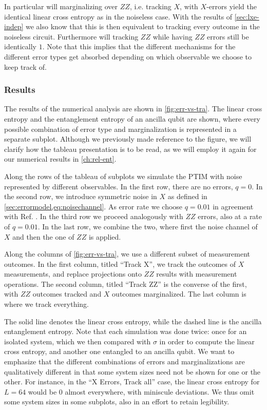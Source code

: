 In particular will marginalizing over $ZZ$, i.e. tracking $X$, with $X$-errors
yield the identical linear cross entropy as in the noiseless case. With the
results of \cref{sec:lxe-indep} we also know that this is then equivalent to
tracking every outcome in the noiseless circuit.
Furthermore will tracking
$ZZ$ while having $ZZ$ errors still be identically $1$. 
Note that this implies that the different mechanisms for the different error
types get absorbed depending on which observable we choose to keep track of. 

\subsubsection{Results}
The results of the numerical analysis are shown in \cref{fig:err-vs-tra}. The
linear cross entropy and the entanglement entropy of an ancilla qubit are shown,
where every possible combination of error type and marginalization is represented in
a separate subplot. Although we previously made reference to the figure, we
will clarify how the tableau presentation is to be read, as we will employ it
again for our numerical results in \cref{ch:rel-ent}.

Along the rows of the
tableau of subplots we simulate the PTIM with noise represented by different
observables. In the first row, there are no errors, $q=0$. In the second row,
we introduce symmetric noise in $X$ as defined in
\cref{sec:errormodel,eq:noisechannel}. As error rate we choose $q=0.01$ in
agreement with Ref. \cite{tikhanovskayaUniversalityCrossEntropy2023}. In the
third row we proceed analogously with $ZZ$ errors, also at a rate of $q=0.01$.
In the last row, we combine the two, where first the noise channel of $X$ and
then the one of $ZZ$ is applied. 

Along the columns of \cref{fig:err-vs-tra}, we use a different subset of
measurement outcomes. In the first column, titled \enquote{Track X}, we track
the outcomes of $X$ measurements, and replace projections onto $ZZ$ results
with measurement operations. The second column, titled \enquote{Track ZZ} is
the converse of the first, with $ZZ$ outcomes tracked and $X$ outcomes
marginalized. The last column is where we track everything. 

The solid line denotes the linear cross entropy, while the dashed line is the
ancilla entanglement entropy. Note that each simulation was done twice: once
for an isolated system, which we then compared with $\sigma$ in order to
compute the linear cross entropy, and another one entangled to an ancilla
qubit.  We want to emphasize that the different combinations of errors and
marginalizations are qualitatively different in that some system sizes need not
be shown for one or the other. For instance, in the \enquote{X Errors, Track
all} case, the linear cross entropy for $L=64$ would be $0$ almost everywhere,
with miniscule deviations. We thus omit some system sizes in some subplots,
also in an effort to retain legibility.

